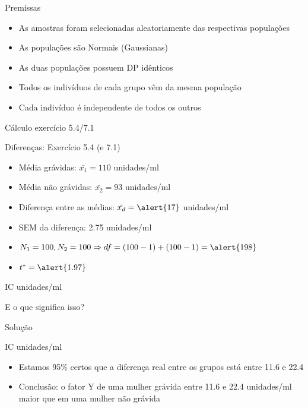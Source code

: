 \documentclass{beamer}
\begin{document}
\begin{frame}{Premissas}
  \begin{itemize}
  \item As amostras foram selecionadas aleatoriamente das respectivas populações
  \item As populações são Normais (Gaussianas)
  \item As duas populações possuem DP idênticos
  \item Todos os indivíduos de cada grupo vêm da mesma população
  \item Cada indivíduo é independente de todos os outros
  \end{itemize}
\end{frame}


\begin{frame}{Cálculo exercício 5.4/7.1}
  \begin{exampleblock}{Diferenças: Exercício 5.4 (e 7.1)}
    \begin{itemize}
    \item Média grávidas: $\bar{x_1} = 110$ unidades/ml
    \item Média não grávidas: $\bar{x_2} = 93$ unidades/ml
    \item Diferença entre as médias: $\bar{x_d} = \alert{17}$ unidades/ml
    \item SEM da diferença: \alert{2.75} unidades/ml
    \item $N_1=100, N_2=100 \Rightarrow df = (100 -1) + (100 - 1) = \alert{198}$
    \item $t^{*} = \alert{1.97}$
    \end{itemize}
  \end{exampleblock}
  \begin{exampleblock}{IC}
    \centering
    [11.6, 22.4] unidades/ml
  \end{exampleblock}
  E o que significa isso?
\end{frame}

\begin{frame}{Solução}
    \begin{exampleblock}{IC}
    \centering
    [11.6, 22.4] unidades/ml
  \end{exampleblock}
  \begin{itemize}
  \item Estamos 95\% certos que a diferença real entre os grupos está entre 11.6 e 22.4
  \item Conclusão: o fator Y de uma mulher grávida entre 11.6 e 22.4 unidades/ml maior que em uma mulher não grávida
  \end{itemize}
\end{frame}
\end{document}
